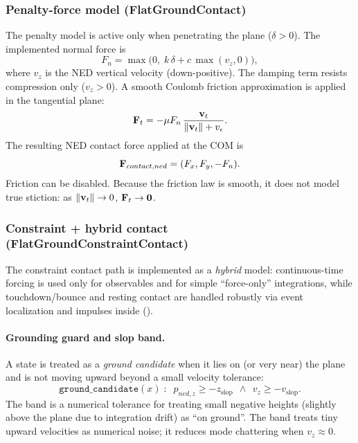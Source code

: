 \subsubsection{Penalty-force model (FlatGroundContact)}
\label{sec:contacts-penalty}

The penalty model is active only when penetrating the plane (\(\delta>0\)). The implemented normal force is
\begin{equation}
  F_n = \max\!\bigl(0,\; k\,\delta + c\,\max(v_z,0)\bigr),
\end{equation}
where \(v_z\) is the NED vertical velocity (down-positive). The damping term resists compression only (\(v_z>0\)). A smooth Coulomb friction approximation is applied in the tangential plane:
\begin{equation}
  \mathbf{F}_t = -\mu F_n\,\frac{\mathbf{v}_{t}}{\|\mathbf{v}_{t}\| + v_{\epsilon}}.
\end{equation}
The resulting NED contact force applied at the COM is
\begin{equation}
  \mathbf{F}_{contact,ned} = (F_x, F_y, -F_n).
\end{equation}
Friction can be disabled. Because the friction law is smooth, it does not model true stiction: as \(\|\mathbf{v}_{t}\|\to 0\), \(\mathbf{F}_t \to \mathbf{0}\).

\subsubsection{Constraint + hybrid contact (FlatGroundConstraintContact)}
\label{sec:contacts-hybrid}

The constraint contact path is implemented as a \emph{hybrid} model: continuous-time forcing is used only for observables and for simple ``force-only'' integrations, while touchdown/bounce and resting contact are handled robustly via event localization and impulses inside  ().

\paragraph{Grounding guard and slop band.}
A state is treated as a \emph{ground candidate} when it lies on (or very near) the plane and is not moving upward beyond a small velocity tolerance:
\begin{equation}
  \texttt{ground\_candidate}(x)\;:\;\; p_{ned,z} \ge -z_{\mathrm{slop}}\ \ \wedge\ \ v_z \ge -v_{\mathrm{slop}}.
\end{equation}
The  band is a numerical tolerance for treating small negative heights (slightly above the plane due to integration drift) as ``on ground''.
The  band treats tiny upward velocities as numerical noise; it reduces mode chattering when \(v_z\approx 0\).


